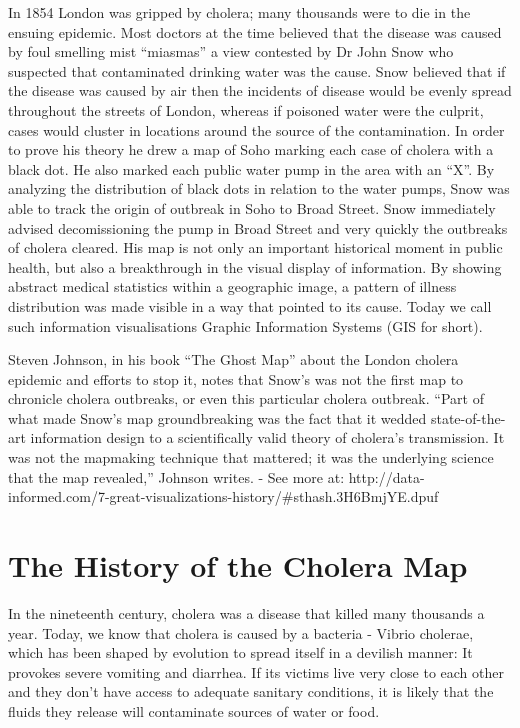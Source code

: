 \documentclass[12pt]{article}
\begin{document}
In 1854 London was gripped by cholera; many thousands were to die in the ensuing epidemic. Most doctors at the time believed that the disease was caused by foul smelling mist “miasmas” a view contested by Dr John Snow who suspected that contaminated drinking water was the cause. Snow believed that if the disease was caused by air then the incidents of disease would be evenly spread throughout the streets of London, whereas if poisoned water were the culprit, cases would cluster in locations around the source of the contamination. In order to prove his theory he drew a map of Soho marking each case of cholera with a black dot. He also marked each public water pump in the area with an “X”. By analyzing the distribution of black dots in relation to the water pumps, Snow was able to track the origin of outbreak in Soho to Broad Street. Snow immediately advised decomissioning the pump in Broad Street and very quickly the outbreaks of cholera cleared. His map is not only an important historical moment in public health, but also a breakthrough in the visual display of information. By showing abstract medical statistics within a geographic image, a pattern of illness distribution was made visible in a way that pointed to its cause. Today we call such information visualisations Graphic Information Systems (GIS for short).







Steven Johnson, in his book “The Ghost Map” about the London cholera epidemic and efforts to stop it, notes that Snow’s was not the first map to chronicle cholera outbreaks, or even this particular cholera outbreak. “Part of what made Snow’s map groundbreaking was the fact that it wedded state-of-the-art information design to a scientifically valid theory of cholera’s transmission. It was not the mapmaking technique that mattered; it was the underlying science that the map revealed,” Johnson writes. - See more at: http://data-informed.com/7-great-visualizations-history/#sthash.3H6BmjYE.dpuf


\section{The History of the Cholera Map}
In the nineteenth century, cholera was a disease that killed many thousands a year. Today, we know that cholera is caused by a bacteria - Vibrio cholerae, which has been shaped by evolution to spread itself in a devilish manner: It provokes severe vomiting and diarrhea. If its victims live very close to each other and they don't have access to adequate sanitary conditions, it is likely that the fluids they release will contaminate sources of water or food.
\end{document}
